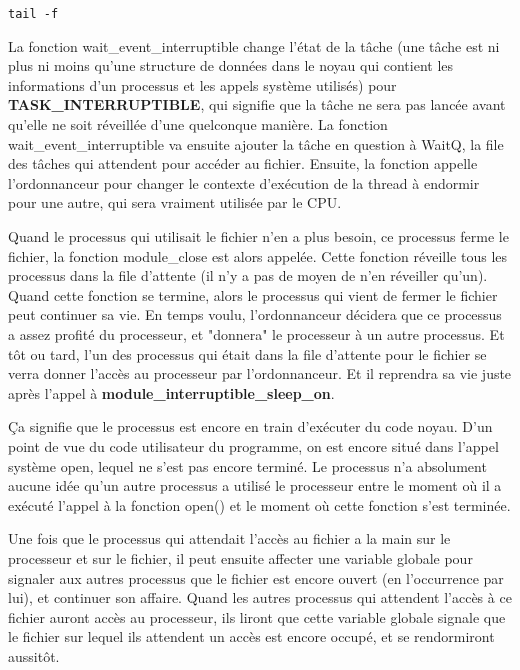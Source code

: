 \documentclass[11pt]{article}
\begin{document}
\begin{verbatim}
tail -f
\end{verbatim}

La fonction wait\_event\_interruptible change l'état de la tâche (une tâche est ni plus ni moins qu'une structure de données dans le noyau qui contient les informations d'un processus et les appels système utilisés) pour \textbf{TASK\_INTERRUPTIBLE}, qui signifie que la tâche ne sera pas lancée avant qu'elle ne soit réveillée d'une quelconque manière. La fonction wait\_event\_interruptible va ensuite ajouter la tâche en question à WaitQ, la file des tâches qui attendent pour accéder au fichier. Ensuite, la fonction appelle l'ordonnanceur pour changer le contexte d'exécution de la thread à endormir pour une autre, qui sera vraiment utilisée par le CPU.

Quand le processus qui utilisait le fichier n'en a plus besoin, ce processus ferme le fichier, la fonction module\_close est alors appelée. Cette fonction réveille tous les processus dans la file d'attente (il n'y a pas de moyen de n'en réveiller qu'un). Quand cette fonction se termine, alors le processus qui vient de fermer le fichier peut continuer sa vie. En temps voulu, l'ordonnanceur décidera que ce processus a assez profité du processeur, et "donnera" le processeur à un autre processus. Et tôt ou tard, l'un des processus qui était dans la file d'attente pour le fichier se verra donner l'accès au processeur par l'ordonnanceur. Et il reprendra sa vie juste après l'appel à \textbf{module\_interruptible\_sleep\_on}.

Ça signifie que le processus est encore en train d'exécuter du code noyau. D'un point de vue du code utilisateur du programme, on est encore situé dans l'appel système open, lequel ne s'est pas encore terminé. Le processus n'a absolument aucune idée qu'un autre processus a utilisé le processeur entre le moment où il a exécuté l'appel à la fonction open() et le moment où cette fonction s'est terminée.

Une fois que le processus qui attendait l'accès au fichier a la main sur le processeur et sur le fichier, il peut ensuite affecter une variable globale pour signaler aux autres processus que le fichier est encore ouvert (en l'occurrence par lui), et continuer son affaire. Quand les autres processus qui attendent l'accès à ce fichier auront accès au processeur, ils liront que cette variable globale signale que le fichier sur lequel ils attendent un accès est encore occupé, et se rendormiront aussitôt.
\end{document}
